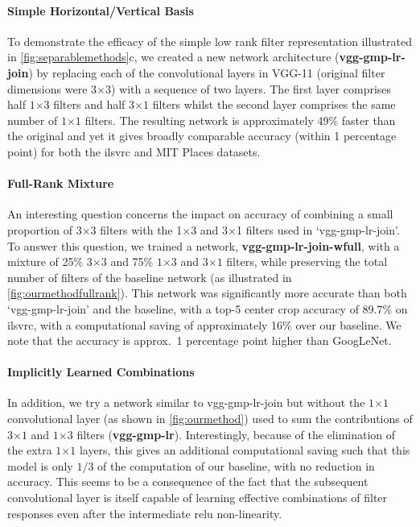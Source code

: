 \documentclass[thesis]{subfiles}
\begin{document}
    \paragraph{Simple Horizontal/Vertical Basis} To demonstrate the efficacy of the simple low rank filter representation illustrated in \cref{fig:separablemethods}c, we created a new network architecture (\textbf{vgg-gmp-lr-join}) by replacing each of the convolutional layers in VGG-11 (original filter dimensions were $3$$\times$$3$) with a sequence of two layers. The first layer comprises half $1$$\times$$3$ filters and half $3$$\times$$1$ filters whilst the second layer comprises the same number of $1$$\times$$1$ filters. The resulting network is approximately 49\% faster than the original and yet it gives broadly comparable accuracy (within 1 percentage point) for both the \gls{ilsvrc} and MIT Places datasets.
    
    \paragraph{Full-Rank Mixture} An interesting question concerns the impact on accuracy of combining a small proportion of 3$\times$3 filters with the 1$\times$3 and 3$\times$1 filters used in ‘vgg-gmp-lr-join’. To answer this question, we trained a network, \textbf{vgg-gmp-lr-join-wfull}, with a mixture of 25\% $3$$\times$$3$ and 75\% $1$$\times$$3$ and $3$$\times$$1$ filters, while preserving the total number of filters of the baseline network (as illustrated in \cref{fig:ourmethodfullrank}). This network was significantly more accurate than both `vgg-gmp-lr-join' and the baseline, with a top-5 center crop accuracy of 89.7\% on \gls{ilsvrc}, with a computational saving of approximately 16\% over our baseline. We note that the accuracy is approx.~1 percentage point higher than GoogLeNet.
    
    \paragraph{Implicitly Learned Combinations} In addition, we try a network similar to vgg-gmp-lr-join but without the $1$$\times$$1$ convolutional layer (as shown in \cref{fig:ourmethod}) used to sum the contributions of $3$$\times$$1$ and $1$$\times$$3$ filters (\textbf{vgg-gmp-lr}). Interestingly, because of the elimination of the extra $1$$\times$$1$ layers, this gives an additional computational saving such that this model is only $1/3$ of the computation of our baseline, with no reduction in accuracy. This seems to be a consequence of the fact that the subsequent convolutional layer is itself capable of learning effective combinations of filter responses even after the intermediate \gls{relu} non-linearity.
    
\end{document}
